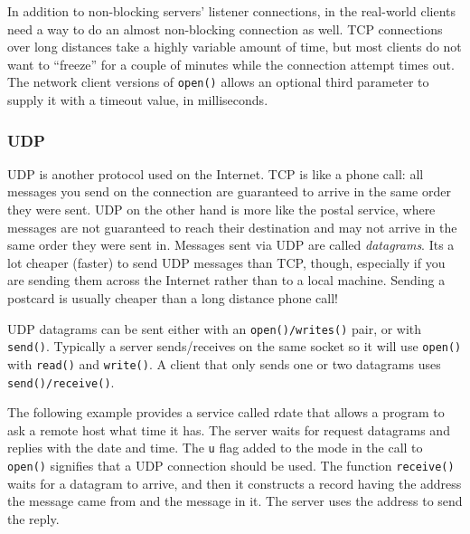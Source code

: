 In addition to non-blocking servers' listener connections, in the real-world
clients need a way to do an almost non-blocking connection as well.
TCP connections over long distances take a highly variable amount of time,
but most clients do not want to ``freeze'' for a couple of minutes while
the connection attempt times out. The network client versions of \texttt{open()}
allows an optional third parameter to supply it with a timeout value,
in milliseconds.

\subsubsection{UDP}

UDP is another protocol used on the Internet. TCP is like a
phone call: all messages you send on the connection are guaranteed to
arrive in the same order they were sent. UDP on the other hand is more
like the postal service, where messages are not guaranteed to reach
their destination and may not arrive in the same order they were sent
in. Messages sent via UDP are called \textit{datagrams}.
It{\textquotesingle}s a lot cheaper (faster) to send UDP messages than
TCP, though, especially if you are sending them across the Internet
rather than to a local machine. Sending a postcard is usually cheaper
than a long distance phone call!

UDP datagrams can be sent either with an \texttt{open()/writes()}
pair, or with \texttt{send()}. Typically a server sends/receives on the
same socket so it will use \texttt{open()} with \texttt{read()} and
\texttt{write()}. A client that only sends one or two datagrams uses
\texttt{send()}\texttt{/}\texttt{receive()}.

The following example provides a service called
{\textquotedbl}rdate{\textquotedbl} that allows a program to ask a
remote host what time it has. The server waits for request datagrams
and replies with the date and time. The
\texttt{{\textquotedbl}u{\textquotedbl}} flag added to the mode in the
call to \texttt{open()} signifies that a UDP connection should be used.
The function \texttt{receive()} waits for a datagram to arrive, and
then it constructs a record having the address the message came from
and the message in it. The server uses the address to send the reply.


